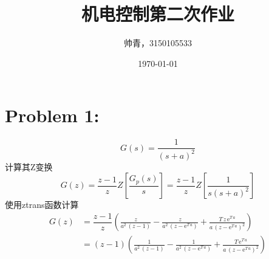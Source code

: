 \documentclass{myrep}
\begin{document}
%
\renewcommand\figurename{图} %
\renewcommand\tablename{表} %
\thispagestyle{empty}

\title{{\heiti{}机电控制第二次作业}}

\author{{\fangsong{}帅青，3150105533}}
\date{\today}
\vspace{-50pt}
\maketitle
\pagestyle{fancy} 


\section*{Problem 1:}
\begin{equation}
	G(s) = \dfrac{1}{(s+a)^2}
\end{equation}
计算其Z变换
\begin{equation}
	G(z) = \dfrac{z-1}{z}Z\left[\dfrac{G_p(s)}{s}\right] = \dfrac{z-1}{z}Z\left[\dfrac{1}{s(s+a)^2}\right]
\end{equation}
使用ztrans函数计算
\begin{align}
	G(z) & = 
	\dfrac{z-1}{z}\left(\frac{z}{a^2\, \left(z - 1\right)} - \frac{z}{a^2\, \left(z - \mathrm{e}^{T\, a}\right)} + \frac{T\, z\, \mathrm{e}^{T\, a}}{a\, {\left(z - \mathrm{e}^{T\, a}\right)}^2}\right)		\\
	& = (z-1)\left(\frac{1}{a^2\, \left(z - 1\right)} - \frac{1}{a^2\, \left(z - \mathrm{e}^{T\, a}\right)} + \frac{T\, \mathrm{e}^{T\, a}}{a\, {\left(z - \mathrm{e}^{T\, a}\right)}^2}\right)
\end{align}
\end{document}
